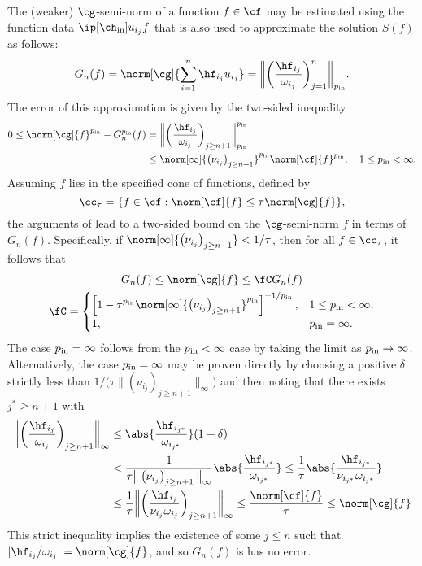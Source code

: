 \documentclass[final]{elsarticle}
\newcommand{\chin}{\ch_{\text{\rm{in}}}}
\newcommand{\pin}{p_{\text{\rm{in}}}}
\theoremstyle{definition}
\theoremstyle{remark}
\begin{document}
The (weaker) $\cg$-semi-norm of a function $f \in \cf$ may be estimated using the function data $\ip[\chin]{u_{i_j}}{f}$ that is also used to approximate the solution $S(f)$ as follows:
\begin{equation} \label{genLGalg}
G_n(f) = \norm[\cg]{\sum_{i=1}^n \hf_{i_j} u_{i_j} } = \bigg\lVert\bigg(\frac{\hf_{i_j}}{\omega_{i_j}}\bigg)_{j=1}^n\bigg\rVert_{\pin}.
\end{equation}
The error of this approximation is given by the two-sided inequality
\begin{align*}
0 \le \norm[\cg]{f}^{\pin} - G_n^{\pin}(f)
&= \bigg\lVert\bigg(\frac{\hf_{i_j}}{\omega_{i_j}}\bigg)_{j\ge n+1}\bigg\rVert_{\pin}^{\pin} \\
& \le \norm[\infty]{\left(\nu_{i_j} \right)_{j\ge n+1}}^{\pin} \norm[\cf]{f}^{\pin}, \quad 1 \le \pin <  \infty.
\end{align*}
Assuming $f$ lies in the specified cone of functions, defined by
\begin{equation} \label{FGconedef}
\cc_{\tau} = \{f \in \cf : \norm[\cf]{f} \le \tau \norm[\cg]{f} \},
\end{equation}
the arguments of \cite{HicEtal14b} lead to a two-sided bound on the $\cg$-semi-norm $f$ in terms of $G_n(f)$.  Specifically, if $\norm[\infty]{\left(\nu_{i_j} \right)_{j\ge n+1}} < 1/\tau$, then for all $f \in \cc_{\tau}$,  it follows that
\begin{gather*}
G_n(f)  \le \norm[\cg]{f} \le \fC G_n(f)\\
\fC=\begin{cases}\displaystyle \left[1 - \tau^{\pin} \norm[\infty]{\left(\nu_{i_j} \right)_{j\ge n+1}}^{\pin}\right]^{-1/\pin}, & 1 \le \pin <  \infty, \\
1, & \pin =  \infty.
\end{cases}
\end{gather*}
The case $\pin=\infty$ follows from the $\pin < \infty$ case by taking the limit as $\pin \to \infty$.  Alternatively, the case $\pin=\infty$ may be proven directly by choosing a positive $\delta$ strictly less than $1/\big(\tau \big\lVert\left(\nu_{i_j} \right)_{j\ge n+1}\big\rVert_{\infty}\big)$ and then noting that there exists $j^* \ge n+1$ with
\begin{align*}
\bigg\lVert\bigg(\frac{\hf_{i_j}}{\omega_{i_j}}\bigg)_{j\ge n+1}\bigg\rVert_{\infty}
& \le  \abs{\frac{\hf_{i_{j^*}}}{\omega_{i_{j^*}}}} (1+\delta) \\
& < \frac{1}{\tau \big\lVert\left(\nu_{i_j} \right)_{j\ge n+1}\big\rVert_{\infty}}  \abs{\frac{\hf_{i_{j^*}}}{\omega_{i_{j^*}}}}
\le \frac{1}{\tau } \abs{\frac{\hf_{i_{j^*}}}{\nu_{i_{j^*}} \omega_{i_{j^*}}}}\\
& \le \frac{1}{\tau }\bigg\lVert\bigg(\frac{\hf_{i_j}}{\nu_{i_j}\omega_{i_j}}\bigg)_{j\ge n+1}\bigg\rVert_{\infty} \le \frac{\norm[\cf]{f}}{\tau} \le \norm[\cg]{f}
\end{align*}
This strict inequality implies the existence of some $j \le n$ such that $\lvert\hf_{i_j}/\omega_{i_j} \rvert = \norm[\cg]{f}$, and so $G_n(f)$ is has no error.
\end{document}
